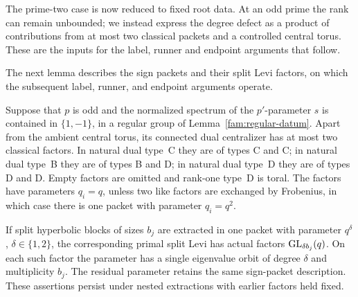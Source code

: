The prime-two case is now reduced to fixed root data.  At an odd
prime the rank can remain unbounded; we instead express the
degree defect as a product of contributions from at most two
classical packets and a controlled central torus.  These are the
inputs for the label, runner and endpoint arguments that follow.

The next lemma describes the sign packets and their split Levi
factors, on which the subsequent label, runner, and endpoint
arguments operate.

\begin{lemma}\label{fam:packets}
Suppose that \(p\) is odd and the normalized spectrum of the
\(p'\)-parameter \(s\) is contained in \(\{1,-1\}\), in a
regular group of Lemma~\ref{fam:regular-datum}.
Apart from the ambient central torus, its connected dual
centralizer has at most two classical factors.  In natural dual
type~C they are of types C and C; in natural dual type~B they are
of types B and D; in natural dual type~D they are of types D
and D.  Empty factors are omitted and rank-one type~D is toral.
The factors have parameters \(q_i=q\), unless two like factors
are exchanged by Frobenius, in which case there is one packet
with parameter \(q_i=q^2\).

If split hyperbolic blocks of sizes \(b_j\) are extracted in
one packet with parameter \(q^\delta\), \(\delta\in\{1,2\}\),
the corresponding primal split Levi has actual factors
\(\operatorname{GL}_{\delta b_j}(q)\).  On each such factor the parameter
has a single eigenvalue orbit of degree \(\delta\) and
multiplicity \(b_j\).  The residual parameter retains the
same sign-packet description.  These assertions persist under
nested extractions with earlier factors held fixed.
\end{lemma}

